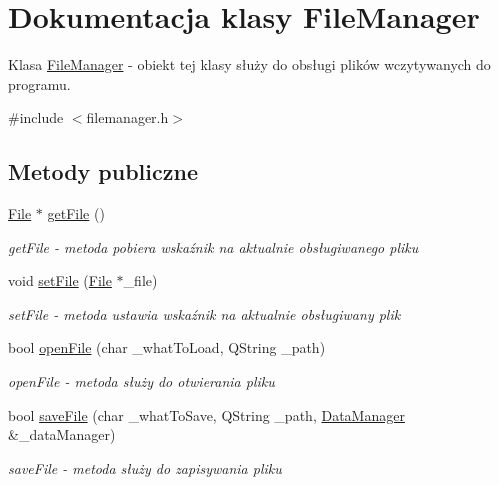 \hypertarget{class_file_manager}{\section{Dokumentacja klasy File\+Manager}
\label{class_file_manager}
}


Klasa \hyperlink{class_file_manager}{File\+Manager} -\/ obiekt tej klasy służy do obsługi plików wczytywanych do programu.  




{\ttfamily \#include $<$filemanager.\+h$>$}

\subsection*{Metody publiczne}
\begin{DoxyCompactItemize}
\item 
\hyperlink{class_file}{File} $\ast$ \hyperlink{class_file_manager_aa7e765d8eab798ee2adef644e163a84a}{get\+File} ()
\begin{DoxyCompactList}\small\item\em get\+File -\/ metoda pobiera wskaźnik na aktualnie obsługiwanego pliku \end{DoxyCompactList}\item 
void \hyperlink{class_file_manager_a9d03f4076a7f1d933d47809d039a6377}{set\+File} (\hyperlink{class_file}{File} $\ast$\+\_\+file)
\begin{DoxyCompactList}\small\item\em set\+File -\/ metoda ustawia wskaźnik na aktualnie obsługiwany plik \end{DoxyCompactList}\item 
bool \hyperlink{class_file_manager_a84ffd312c627e3e28501fd3169b3d59d}{open\+File} (char \+\_\+what\+To\+Load, Q\+String \+\_\+path)
\begin{DoxyCompactList}\small\item\em open\+File -\/ metoda służy do otwierania pliku \end{DoxyCompactList}\item 
bool \hyperlink{class_file_manager_a7718e386811bca53267f3cfc09a15906}{save\+File} (char \+\_\+what\+To\+Save, Q\+String \+\_\+path, \hyperlink{class_data_manager}{Data\+Manager} \&\+\_\+data\+Manager)
\begin{DoxyCompactList}\small\item\em save\+File -\/ metoda służy do zapisywania pliku \end{DoxyCompactList}\end{DoxyCompactItemize}


